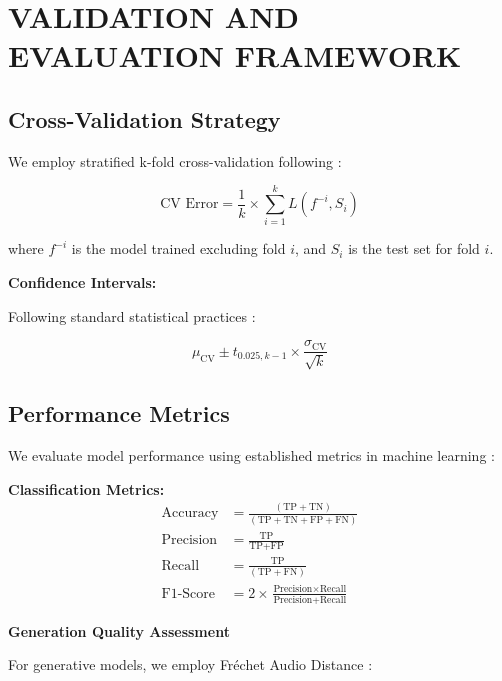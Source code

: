 \documentclass[12pt,a4paper]{article}
\begin{document}
\section{VALIDATION AND EVALUATION FRAMEWORK}

\subsection{Cross-Validation Strategy}

We employ stratified k-fold cross-validation following \citet{kohavi1995study}:

\begin{equation}
\text{CV Error} = \frac{1}{k} \times \sum_{i=1}^k L(f^{-i}, S_i)
\end{equation}

where $f^{-i}$ is the model trained excluding fold $i$, and $S_i$ is the test set for fold $i$.

\textbf{Confidence Intervals:}

Following standard statistical practices \citep{dietterich1998approximate}:

\begin{equation}
\mu_{\text{CV}} \pm t_{0.025,k-1} \times \frac{\sigma_{\text{CV}}}{\sqrt{k}}
\end{equation}

\subsection{Performance Metrics}

We evaluate model performance using established metrics in machine learning \citep{hastie2009elements, bishop2006pattern}:

\textbf{Classification Metrics:}
\begin{align}
\text{Accuracy} &= \frac{(\text{TP} + \text{TN})}{(\text{TP} + \text{TN} + \text{FP} + \text{FN})} \\
\text{Precision} &= \frac{\text{TP}}{\text{TP} + \text{FP}} \\
\text{Recall} &= \frac{\text{TP}}{(\text{TP} + \text{FN})} \\
\text{F1-Score} &= 2 \times \frac{\text{Precision} \times \text{Recall}}{\text{Precision} + \text{Recall}}
\end{align}

\textbf{Generation Quality Assessment}

For generative models, we employ Fréchet Audio Distance \citep{kilgour2018frechet}:
\end{document}
